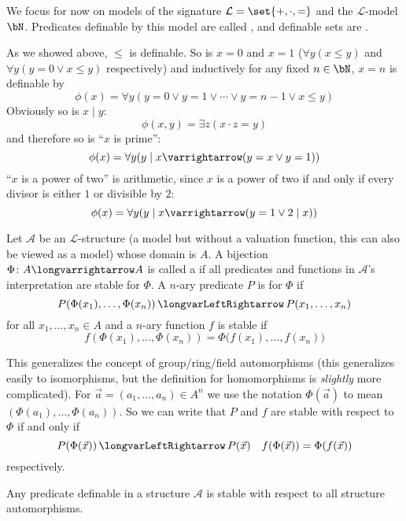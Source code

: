 \documentclass[10pt]{article}
\def\iff{\,\longvarLeftRightarrow\,}
\let\to=\varrightarrow
\let\longto=\longvarrightarrow
\def\mA{\mathcal{A}}
\def\mL{\mathcal{L}}
\let\divides=\mid
\begin{document}
\begin{defn*}

    We focus for now on models of the signature $\mL=\set{+,\cdot,=}$ and the $\mL$-model $\bN$.
    Predicates definable by this model are called , and definable sets are .

\end{defn*}

As we showed above, $\leq$ is definable.
So is $x=0$ and $x=1$ ($\forall y(x\leq y)$ and $\forall y(y=0\lor x\leq y)$ respectively) and inductively for any fixed $n\in\bN$, $x=n$ is definable by
\[ \phi(x) = \forall y(y=0\lor y=1\lor\cdots\lor y=n-1\lor x\leq y) \]
Obviously so is $x\divides y$:
\[ \phi(x,y) = \exists z(x\cdot z=y) \]
and therefore so is ``$x$ is prime'':
\[ \phi(x) = \forall y(y\divides x\to(y=x\lor y=1)) \]
``$x$ is a power of two'' is arithmetic, since $x$ is a power of two if and only if every divisor is either $1$ or divisible by $2$:
\[ \phi(x) = \forall y(y\divides x\to(y=1\lor 2\divides x)) \]

\begin{defn*}

    Let $\mA$ be an $\mL$-structure (a model but without a valuation function, this can also be viewed as a model) whose domain is $A$.
    A bijection $\Phi\colon A\longto A$ is called a  if all predicates and functions in $\mA$'s interpretation are stable for $\Phi$.
    A $n$-ary predicate $P$ is  for $\Phi$ if
    \[ P(\Phi(x_1),\dots,\Phi(x_n)) \iff P(x_1,\dots,x_n) \]
    for all $x_1,\dots,x_n\in A$ and a $n$-ary function $f$ is stable if
    \[ f(\Phi(x_1),\dots,\Phi(x_n)) = \Phi\bigl(f(x_1),\dots,f(x_n)\bigr) \]

\end{defn*}

This generalizes the concept of group/ring/field automorphisms (this generalizes easily to isomorphisms, but the definition for homomorphisms is \emph{slightly} more complicated).
For $\vec a=(a_1,\dots,a_n)\in A^n$ we use the notation $\Phi(\vec a)$ to mean $(\Phi(a_1),\dots,\Phi(a_n))$.
So we can write that $P$ and $f$ are stable with respect to $\Phi$ if and only if
\[ P(\Phi(\vec x)) \iff P(\vec x)\quad f(\Phi(\vec x)) = \Phi(f(\vec x)) \]
respectively.

\begin{thrm*}

    Any predicate definable in a structure $\mA$ is stable with respect to all structure automorphisms.

\end{thrm*}
\end{document}
